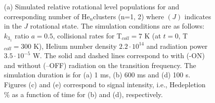 \begin{figure}[!htb]
\begin{adjustbox}{minipage=\linewidth,scale=0.9}
    \hfill
    \hfill
    
    \end{adjustbox}
    
    \caption{
        (a) Simulated relative rotational level populations for
        \CD and corresponding number of He$_n$\CD clusters (n=1, 2) 
        where \CD$(J)$ indicates \CD in the $J$ rotational state. 
        The simulation conditions are as follows: $k_{3_1}$ ratio $a=0.5$, 
        collisional rates for T$_{coll}=7$ K  (at $t=0$, T$_{coll}=300$ K), 
        Helium number density $2.2 \cdot 10^{14}$ \percc and radiation power $3.5\cdot10^{-5}$ W. 
        The solid and dashed lines correspond to with (-ON) and without (--OFF) 
        radiation on the \CD \CDline transition frequency. 
        The simulation duration is for (a) 1 ms, (b) 600 ms and (d) 100 s. 
        Figures (c) and (e) correspond to signal intensity, i.e., He\CD depletion \% as a 
        function of time for (b) and (d), respectively.
    }
    
    \label{fig:thz-sim:rel-pop}

\end{figure}
